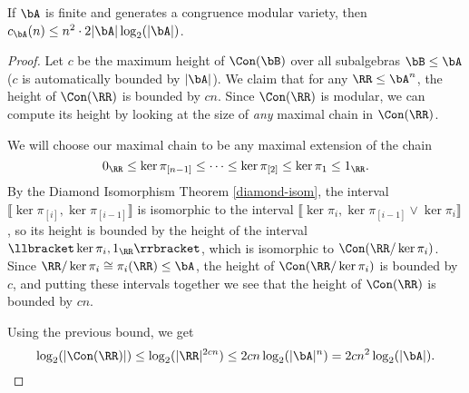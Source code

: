 \begin{cor} If $\bA$ is finite and generates a congruence modular variety, then $c_{\bA}(n) \le n^2 \cdot 2|\bA|\log_2(|\bA|)$.
\end{cor}
\begin{proof} Let $c$ be the maximum height of $\Con(\bB)$ over all subalgebras $\bB \le \bA$ ($c$ is automatically bounded by $|\bA|$). We claim that for any $\RR \le \bA^n$, the height of $\Con(\RR)$ is bounded by $cn$. Since $\Con(\RR)$ is modular, we can compute its height by looking at the size of \emph{any} maximal chain in $\Con(\RR)$.

We will choose our maximal chain to be any maximal extension of the chain
\[
0_\RR \le \ker \pi_{[n-1]} \le \cdots \le \ker \pi_{[2]} \le \ker \pi_1 \le 1_\RR.
\]
By the Diamond Isomorphism Theorem \ref{diamond-isom}, the interval $\llbracket \ker \pi_{[i]}, \ker \pi_{[i-1]} \rrbracket$ is isomorphic to the interval $\llbracket \ker \pi_i, \ker \pi_{[i-1]}\vee \ker \pi_i\rrbracket$, so its height is bounded by the height of the interval $\llbracket \ker \pi_i, 1_\RR \rrbracket$, which is isomorphic to $\Con(\RR/\ker \pi_i)$. Since $\RR/\ker \pi_i \cong \pi_i(\RR) \le \bA$, the height of $\Con(\RR/\ker \pi_i)$ is bounded by $c$, and putting these intervals together we see that the height of $\Con(\RR)$ is bounded by $cn$.

Using the previous bound, we get
\[
\log_2(|\Con(\RR)|) \le \log_2(|\RR|^{2cn}) \le 2cn \log_2(|\bA|^n) = 2cn^2 \log_2(|\bA|).\qedhere
\]
\end{proof}

